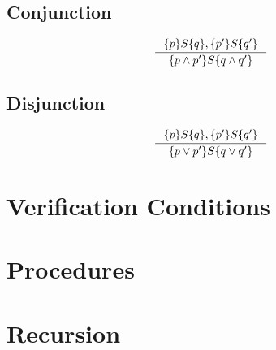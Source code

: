 \documentclass[12pt, a4paper]{book}
\begin{document}
    \subsection{Conjunction}

    \begin{center}
    \begin{minipage}{0.5\linewidth}
    \begin{framed}
        \[
        \inference{ \{ p \} S \{ q \}, \{ p' \} S \{ q' \} }
        { \{ p \land p' \} S \{ q \land q' \} }
        \]
    \end{framed}
    \end{minipage}
    \end{center}

    \subsection{Disjunction}

    \begin{center}
    \begin{minipage}{0.5\linewidth}
    \begin{framed}
        \[
        \inference{ \{ p \} S \{ q \}, \{ p' \} S \{ q' \} }
        { \{ p \lor p' \} S \{ q \lor q' \} }
        \]
    \end{framed}
    \end{minipage}
    \end{center}


  \section{Verification Conditions}
  \label{sec:Verification Conditions}
  \section{Procedures}
  \label{sec:Procedures}

  \section{Recursion}
  \label{sec:Recursion}
\end{document}
